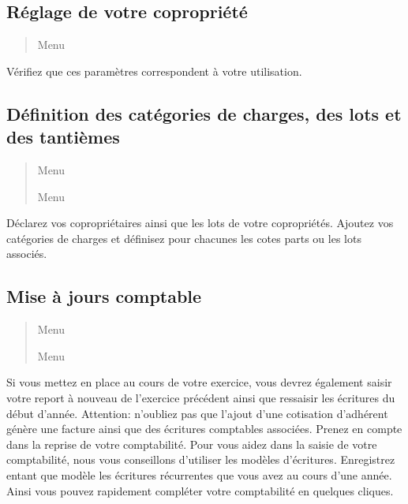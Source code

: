 \documentclass[a4paper,10pt,oneside,french]{sphinxmanual}
\begin{document}
\subsection{Réglage de votre copropriété}
\label{\detokenize{syndic/first_step:reglage-de-votre-copropriete}}\begin{quote}

Menu 
\end{quote}

Vérifiez que ces paramètres correspondent à votre utilisation.


\subsection{Définition des catégories de charges, des lots et des tantièmes}
\label{\detokenize{syndic/first_step:definition-des-categories-de-charges-des-lots-et-des-tantiemes}}\begin{quote}

Menu 

Menu 
\end{quote}

Déclarez vos copropriétaires ainsi que les lots de votre copropriétés.
Ajoutez vos catégories de charges et définisez pour chacunes les cotes parts ou les lots associés.


\subsection{Mise à jours comptable}
\label{\detokenize{syndic/first_step:mise-a-jours-comptable}}\begin{quote}

Menu 

Menu 
\end{quote}

Si vous mettez en place  au cours de votre exercice, vous devrez également saisir votre report à nouveau de l’exercice précédent ainsi que ressaisir les écritures du début d’année.
Attention: n’oubliez pas que l’ajout d’une cotisation d’adhérent génère une facture ainsi que des écritures comptables associées. Prenez en compte dans la reprise de votre comptabilité.
Pour vous aidez dans la saisie de votre comptabilité, nous vous conseillons d’utiliser les modèles d’écritures. Enregistrez entant que modèle les écritures récurrentes que vous avez au cours d’une année. Ainsi vous pouvez rapidement compléter votre comptabilité en quelques cliques.
\end{document}
